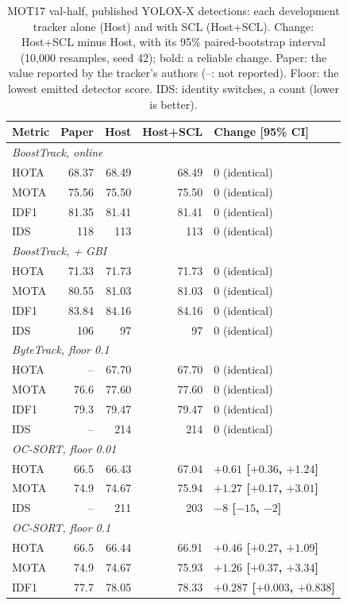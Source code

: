 \begin{table}[tbp]
\centering
\caption{MOT17 val-half, published YOLOX-X detections: each development tracker alone (Host) and with SCL (Host+SCL). Change: Host+SCL minus Host, with its 95\% paired-bootstrap interval (10,000 resamples, seed 42); bold: a reliable change. Paper: the value reported by the tracker's authors (--: not reported). Floor: the lowest emitted detector score. IDS: identity switches, a count (lower is better).}
\label{tab:res-scl-mot17}
\begin{tabular}{lrrrl}
\toprule
Metric & Paper & Host & Host+SCL & Change [95\% CI]\\
\midrule
\multicolumn{5}{l}{\textit{BoostTrack, online} \cite{stanojevic2024boosttrack}}\\
\quad HOTA & 68.37 & 68.49 & 68.49 & 0 (identical)\\
\quad MOTA & 75.56 & 75.50 & 75.50 & 0 (identical)\\
\quad IDF1 & 81.35 & 81.41 & 81.41 & 0 (identical)\\
\quad IDS & 118 & 113 & 113 & 0 (identical)\\
\multicolumn{5}{l}{\textit{BoostTrack, + GBI} \cite{stanojevic2024boosttrack}}\\
\quad HOTA & 71.33 & 71.73 & 71.73 & 0 (identical)\\
\quad MOTA & 80.55 & 81.03 & 81.03 & 0 (identical)\\
\quad IDF1 & 83.84 & 84.16 & 84.16 & 0 (identical)\\
\quad IDS & 106 & 97 & 97 & 0 (identical)\\
\multicolumn{5}{l}{\textit{ByteTrack, floor 0.1} \cite{zhang2022bytetrack}}\\
\quad HOTA & -- & 67.70 & 67.70 & 0 (identical)\\
\quad MOTA & 76.6 & 77.60 & 77.60 & 0 (identical)\\
\quad IDF1 & 79.3 & 79.47 & 79.47 & 0 (identical)\\
\quad IDS & -- & 214 & 214 & 0 (identical)\\
\multicolumn{5}{l}{\textit{OC-SORT, floor 0.01} \cite{cao2023ocsort}}\\
\quad HOTA & 66.5 & 66.43 & 67.04 & \textbf{$+0.61$ [$+0.36$, $+1.24$]}\\
\quad MOTA & 74.9 & 74.67 & 75.94 & \textbf{$+1.27$ [$+0.17$, $+3.01$]}\\
\quad IDS & -- & 211 & 203 & \textbf{$-8$ [$-15$, $-2$]}\\
\multicolumn{5}{l}{\textit{OC-SORT, floor 0.1} \cite{cao2023ocsort}}\\
\quad HOTA & 66.5 & 66.44 & 66.91 & \textbf{$+0.46$ [$+0.27$, $+1.09$]}\\
\quad MOTA & 74.9 & 74.67 & 75.93 & \textbf{$+1.26$ [$+0.37$, $+3.34$]}\\
\quad IDF1 & 77.7 & 78.05 & 78.33 & \textbf{$+0.287$ [$+0.003$, $+0.838$]}\\
\bottomrule
\end{tabular}
\end{table}

